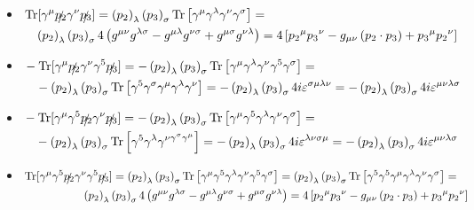 \begin{itemize}
\item $\begin{multlined}[t]
\Tr[ \gamma ^{\mu }\slashed{p_{2}}\gamma ^{\nu }\slashed{p_{3}}]= \left( p_{2}\right) _{\lambda }\left( p_{3}\right) _{\sigma } \Tr\left[ \gamma ^{\mu }\gamma ^{\lambda }\gamma ^{\nu }\gamma ^{\sigma }\right] = \\ \left( p_{2}\right) _{\lambda }\left( p_{3}\right) _{\sigma }4\left( g^{\mu\nu}g^{\lambda \sigma} -g^{\mu \lambda }g^{\nu \sigma }+g^{\mu \sigma }g^{\nu \lambda }\right) = 4\left[{p_{2}}^{\mu }{ p_{3}}^{\nu }-g_{\mu \nu }\left( p_{2}\cdot p_{3}\right) +{p_{3}}^{\mu } {p_{2}}^{\nu }\right]
\end{multlined}$
\item $\begin{multlined}[t]
- \Tr[\gamma ^{\mu }\slashed{p_{2}}\gamma ^{\nu }\gamma ^{5}\slashed{p_{3}}] = -\left( p_{2}\right) _{\lambda }\left( p_{3}\right) _{\sigma } \Tr\left[ \gamma ^{\mu }\gamma ^{\lambda }\gamma ^{\nu }\gamma^5 \gamma ^{\sigma }\right] = \\ -\left( p_{2}\right) _{\lambda }\left( p_{3}\right) _{\sigma } \Tr\left[\gamma^5 \gamma ^{\sigma }\gamma ^{\mu }\gamma ^{\lambda }\gamma ^{\nu }\right]=-\left( p_{2}\right) _{\lambda }\left( p_{3}\right) _{\sigma }4i\varepsilon ^{\sigma \mu \lambda \nu }=-\left( p_{2}\right) _{\lambda }\left( p_{3}\right) _{\sigma }4i\varepsilon ^{\mu \nu \lambda \sigma}
\end{multlined}$
\item $\begin{multlined}[t]
- \Tr[\gamma ^{\mu }\gamma ^{5}\slashed{p_{2}}\gamma ^{\nu }\slashed{p_{3}}]= -\left( p_{2}\right) _{\lambda }\left( p_{3}\right) _{\sigma } \Tr\left[ \gamma ^{\mu }\gamma^5 \gamma ^{\lambda }\gamma ^{\nu }\gamma ^{\sigma }\right] = \\ -\left( p_{2}\right) _{\lambda }\left( p_{3}\right) _{\sigma } \Tr\left[\gamma^5\gamma ^{\lambda }\gamma ^{\nu \gamma ^{\sigma }\gamma ^{\mu }}\right]= -\left( p_{2}\right) _{\lambda }\left( p_{3}\right) _{\sigma }4i\varepsilon ^{\lambda \nu \sigma \mu} = -\left( p_{2}\right) _{\lambda }\left( p_{3}\right) _{\sigma }4i\varepsilon ^{\mu \nu \lambda \sigma}
\end{multlined}$
\item $\begin{multlined}[t]
\Tr[ \gamma ^{\mu }\gamma ^{5}\slashed{p_{2}}\gamma ^{\nu }\gamma ^{5}\slashed{p_{3}}]= \left( p_{2}\right) _{\lambda }\left( p_{3}\right) _{\sigma } \Tr\left[ \gamma ^{\mu }\gamma ^{5}\gamma ^{\lambda }\gamma ^{\nu }\gamma ^{5}\gamma ^{\sigma }\right] = \left( p_{2}\right) _{\lambda }\left( p_{3}\right) _{\sigma } \Tr\left[\gamma ^{5}\gamma ^{5} \gamma ^{\mu }\gamma ^{\lambda }\gamma ^{\nu }\gamma ^{\sigma }\right]= \\ \left( p_{2}\right) _{\lambda }\left( p_{3}\right) _{\sigma }4\left( g^{\mu\nu}g^{\lambda \sigma} -g^{\mu \lambda }g^{\nu \sigma }+g^{\mu \sigma }g^{\nu \lambda }\right) = 4\left[{p_{2}}^{\mu }{ p_{3}}^{\nu }-g_{\mu \nu }\left( p_{2}\cdot p_{3}\right) +{p_{3}}^{\mu } {p_{2}}^{\nu }\right]
\end{multlined}$ 
\end{itemize}

